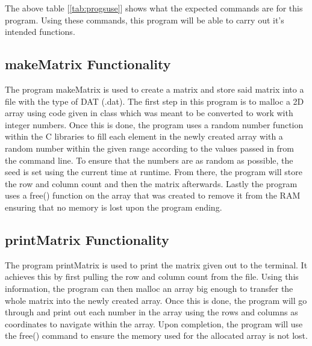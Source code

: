 \documentclass{article}
\begin{document}
    \begin{multicols}{2}
    The above table [\ref{tab:progsuse}] shows what the expected commands are for this program. Using these commands, this program will be able
    to carry out it's intended functions.

    \subsection{makeMatrix Functionality}\label{subsec:makeMatrixFunc}
    The program makeMatrix is used to create a matrix and store said matrix into a file with the type of DAT (.dat). The first step in this program
    is to malloc a 2D array using code given in class which was meant to be converted to work with integer numbers. Once this is done, the program
    uses a random number function within the C libraries to fill each element in the newly created array with a random number within the given range
    according to the values passed in from the command line. To ensure that the numbers are as random as possible, the seed is set using the current
    time at runtime. From there, the program will store the row and column count and then the matrix afterwards. Lastly the program uses a free()
    function on the array that was created to remove it from the RAM ensuring that no memory is lost upon the program ending.
    \subsection{printMatrix Functionality}\label{subsec:printMatrixFunc}
    The program printMatrix is used to print the matrix given out to the terminal. It achieves this by first pulling the row and column count from
    the file. Using this information, the program can then malloc an array big enough to transfer the whole matrix into the newly created array. Once
    this is done, the program will go through and print out each number in the array using the rows and columns as coordinates to navigate within the
    array. Upon completion, the program will use the free() command to ensure the memory used for the allocated array is not lost.

\end{multicols}
\end{document}
